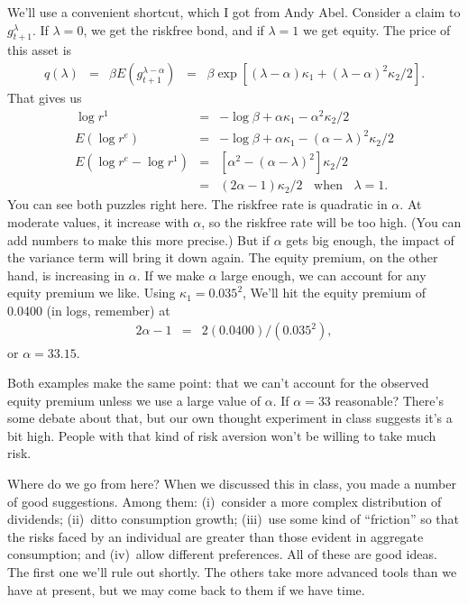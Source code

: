\documentclass[11pt]{article}
\begin{document}
We'll use a convenient shortcut, which I got from Andy Abel.
Consider a claim to $g_{t+1}^\lambda$.
If $\lambda = 0$, we get the riskfree bond,
and if $\lambda = 1$ we get equity.
The price of this asset is
\begin{eqnarray*}
    q(\lambda) &=& \beta E \left( g_{t+1}^{\lambda-\alpha} \right)
            \;\;=\;\; \beta \exp \left[ (\lambda - \alpha) \kappa_1
                    + (\lambda-\alpha)^2 \kappa_2 /2 \right] .
\end{eqnarray*}
That gives us
\begin{eqnarray*}
   \log r^1  &=& - \log \beta + \alpha \kappa_1 - \alpha^2 \kappa_2/2 \\
   E (\log r^e ) &=& - \log \beta + \alpha \kappa_1 - (\alpha-\lambda)^2 \kappa_2/2 \\
   E (\log r^e - \log r^1 )
        &=& [ \alpha^2 -  (\alpha-\lambda)^2 ] \kappa_2/2  \\
        &=& (2\alpha - 1)  \kappa_2/2 \;\; \mbox{ when } \;\; \lambda = 1 .
\end{eqnarray*}
You can see both puzzles right here.
The riskfree rate is quadratic in $\alpha$.
At moderate values, it increase with $\alpha$, so the riskfree rate will be too high.
(You can add numbers to make this more precise.)
But if $\alpha$ gets big enough, the impact of the variance term will bring it down again.
The equity premium, on the other hand, is increasing in $\alpha$.
If we make $\alpha$ large enough, we can account for any equity premium we like.
Using $\kappa_1 = 0.035^2 $,
We'll hit the equity premium of 0.0400 (in logs, remember) at
\begin{eqnarray*}
    2 \alpha - 1 &=& 2 (0.0400) / (0.035^2) ,
\end{eqnarray*}
or $\alpha = 33.15$.

Both examples make the same point:
that we can't account for the observed equity premium unless
we use a large value of $\alpha$.
If $\alpha = 33$ reasonable?
There's some debate about that,
but our own thought experiment in class suggests it's a bit high.
People with that kind of risk aversion won't be willing to take much risk.

Where do we go from here?
When we discussed this in class,
you made a number of good suggestions.
Among them:
(i)~consider a more complex distribution of dividends;
(ii)~ditto consumption growth;
(iii)~use some kind of ``friction'' so that the risks faced by an individual
are greater than those evident in aggregate consumption; and
(iv)~allow different preferences.
All of these are good ideas.
The first one we'll rule out shortly.
The others take more advanced tools than we have at present,
but we may come back to them if we have time.
\end{document}
